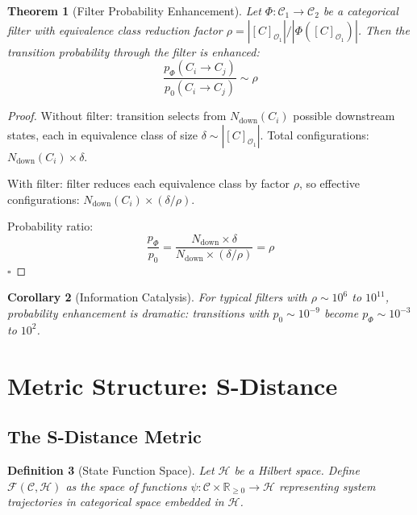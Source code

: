 \documentclass[12pt,a4paper]{article}
\newtheorem{theorem}{Theorem}[section]
\newtheorem{corollary}[theorem]{Corollary}
\newtheorem{definition}[theorem]{Definition}
\begin{document}
\begin{theorem}[Filter Probability Enhancement]
\label{thm:filter_probability}
Let $\Phi: \mathcal{C}_1 \to \mathcal{C}_2$ be a categorical filter with equivalence class reduction factor $\rho = |[C]_{\mathcal{O}_1}| / |\Phi([C]_{\mathcal{O}_1})|$. Then the transition probability through the filter is enhanced:
\begin{equation}
\frac{p_{\Phi}(C_i \to C_j)}{p_0(C_i \to C_j)} \sim \rho
\end{equation}
\end{theorem}

\begin{proof}
Without filter: transition selects from $N_{\text{down}}(C_i)$ possible downstream states, each in equivalence class of size $\delta \sim |[C]_{\mathcal{O}_1}|$. Total configurations: $N_{\text{down}}(C_i) \times \delta$.

With filter: filter reduces each equivalence class by factor $\rho$, so effective configurations: $N_{\text{down}}(C_i) \times (\delta/\rho)$.

Probability ratio:
\begin{equation}
\frac{p_{\Phi}}{p_0} = \frac{N_{\text{down}} \times \delta}{N_{\text{down}} \times (\delta/\rho)} = \rho
\end{equation}
$\square$
\end{proof}

\begin{corollary}[Information Catalysis]
\label{cor:information_catalysis}
For typical filters with $\rho \sim 10^6$ to $10^{11}$, probability enhancement is dramatic: transitions with $p_0 \sim 10^{-9}$ become $p_{\Phi} \sim 10^{-3}$ to $10^2$.
\end{corollary}

\section{Metric Structure: S-Distance}

\subsection{The S-Distance Metric}

\begin{definition}[State Function Space]
\label{def:state_function_space}
Let $\mathcal{H}$ be a Hilbert space. Define $\mathcal{F}(\mathcal{C}, \mathcal{H})$ as the space of functions $\psi: \mathcal{C} \times \mathbb{R}_{\geq 0} \to \mathcal{H}$ representing system trajectories in categorical space embedded in $\mathcal{H}$.
\end{definition}
\end{document}

